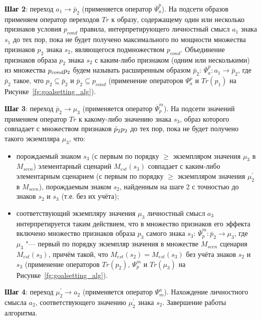 \begin{appendices}
\textbf{Шаг 2}: переход $a_1\rightarrow\bar p_2$  (применяется оператор $\overline{\Psi}_a^p$). На подсети образов применяем оператор переходов $Tr$ к образу, содержащему один или несколько признаков условия $p_{cond}$ правила, интерпретирующего личностный смысл $a_1$ знака $s_1$ до тех пор, пока не будет получено максимального по мощности множества признаков $p_2$ знака $s_2$, являющегося подмножеством $p_{cond}$. Объединение признаков образа $p_2$ знака $s_2$ с каким-либо признаком (одним или несколькими) из множества $p_{cond}\\p_2$ будем называть расширенным образом $\bar p_2$: $\overline{\Psi}_a^p:a_1\rightarrow\bar p_2$, где $\bar p_2$ такое, что $p_2\subseteq\bar p_2$  и  $\bar p_2\subseteq p_{cond}$ (применение операторов $\Psi_a^p$ и $Tr(p_1)$ на Рисунке~\ref{fg:goalsetting_alg}).

\textbf{Шаг 3}: переход $\bar p_2\rightarrow\mu_3$ (применяется оператор $\overline{\Psi}_p^m$). На подсети значений применяем оператор $Tr$ к какому-либо значению знака $s_3$, образ которого совпадает с множеством признаков $\bar p_2\\p_2$ до тех пор, пока не будет получено такого экземпляра $\mu_3$, что:
\begin{itemize}
	\item порождаемый знаком $s_3$ (с первым по порядку $\geqslant$ экземпляром значения $\mu_3$ в $M_{scen}$) элементарный сценарий $M_{est}(s_3)$ совпадает с каким-либо элементарным сценарием (с первым по порядку $\geqslant$ экземпляром значения $\mu^\prime_2$ в $M_{scen}$), порождаемым знаком $s_2$, найденным на шаге 2 с точностью до знаков $s_2$ и $s_3$ (т.е. без их учёта);
	\item соответствующий экземпляру значения $\mu_3$ личностный смысл $a_3$ интерпретируется таким действием, что в множество признаков его эффекта включено множество признаков образа $p_3$ самого знака $s_3$: $\overline{\Psi}_p^m:\bar p_2\rightarrow\mu_3$, где $\mu_3$ "--- первый по порядку экземпляр значения в множестве $M_{scen}$ сценария $M_{est}(s_3)$, причём   такой, что $M_{est}(s_2)=M_{est}(s_3)$ без учёта знаков $s_2$ и $s_3$ (применение операторов $Tr(p_2)$, $\Psi_p^m$ и $Tr(\mu_3)$ на Рисунке~\ref{fg:goalsetting_alg}).
\end{itemize}

\textbf{Шаг 4}: переход $\mu^\prime_2\rightarrow a_2$ (применяется оператор $\Psi_m^a$). Нахождение личностного смысла $a_2$, соответствующего значению $\mu^\prime_2$ знака $s_2$. Завершение работы алгоритма.


\end{appendices}
